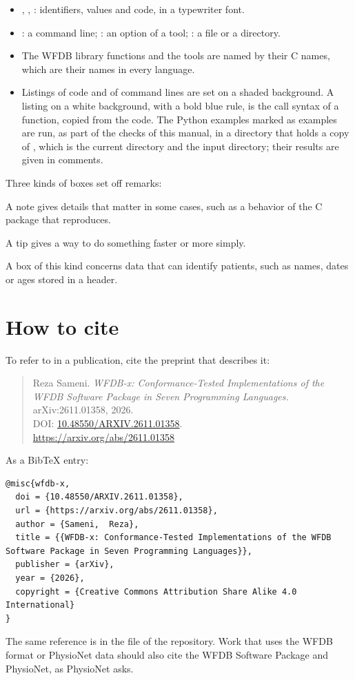 \begin{itemize}
\item {}, , :
  identifiers, values and code, in a typewriter font.
\item {}: a command line; : an option of a tool;
  : a file or a directory.
\item The WFDB library functions and the tools are named by their C names,
  which are their names in every language.
\item Listings of code and of command lines are set on a shaded background.
  A listing on a white background, with a bold blue rule, is the call syntax
  of a function, copied from the code. The Python examples marked as
  examples are run, as part of the checks of this manual, in a directory
  that holds a copy of , which is the current directory and
  the input directory; their results are given in comments.
\end{itemize}
Three kinds of boxes set off remarks:
\begin{note}
A note gives details that matter in some cases, such as a behavior of the C
package that \wfdbx{} reproduces.
\end{note}
\begin{tip}
A tip gives a way to do something faster or more simply.
\end{tip}
\begin{phibox}
A box of this kind concerns data that can identify patients, such as names,
dates or ages stored in a header.
\end{phibox}

\section{How to cite}
\label{sec:cite}

To refer to \wfdbx{} in a publication, cite the preprint that describes it:
\begin{quote}
Reza Sameni. \emph{WFDB-x: Conformance-Tested Implementations of the WFDB
Software Package in Seven Programming Languages.} arXiv:2611.01358, 2026.\\
DOI: \href{https://doi.org/10.48550/arXiv.2611.01358}{10.48550/ARXIV.2611.01358}.\\
\url{https://arxiv.org/abs/2611.01358}
\end{quote}
As a BibTeX entry:
\begin{lstlisting}[style=text]
@misc{wfdb-x,
  doi = {10.48550/ARXIV.2611.01358},
  url = {https://arxiv.org/abs/2611.01358},
  author = {Sameni,  Reza},
  title = {{WFDB-x: Conformance-Tested Implementations of the WFDB Software Package in Seven Programming Languages}},
  publisher = {arXiv},
  year = {2026},
  copyright = {Creative Commons Attribution Share Alike 4.0 International}
}
\end{lstlisting}
The same reference is in the file  of the repository.
Work that uses the WFDB format or PhysioNet data should also cite the WFDB
Software Package and PhysioNet, as PhysioNet asks.

